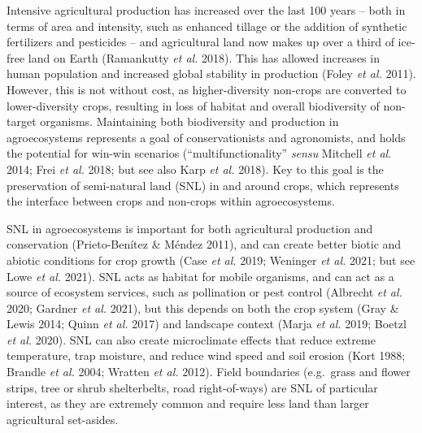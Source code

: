 \documentclass[]{elsarticle} %
\begin{document}
Intensive agricultural production has increased over the last 100 years -- both in terms of area and intensity, such as enhanced tillage or the addition of synthetic fertilizers and pesticides -- and agricultural land now makes up over a third of ice-free land on Earth (Ramankutty \emph{et al.} 2018).
This has allowed increases in human population and increased global stability in production (Foley \emph{et al.} 2011).
However, this is not without cost, as higher-diversity non-crops are converted to lower-diversity crops, resulting in loss of habitat and overall biodiversity of non-target organisms.
Maintaining both biodiversity and production in agroecosystems represents a goal of conservationists and agronomists, and holds the potential for win-win scenarios ({``multifunctionality''} \emph{sensu} Mitchell \emph{et al.} 2014; Frei \emph{et al.} 2018; but see also Karp \emph{et al.} 2018).
Key to this goal is the preservation of semi-natural land (SNL) in and around crops, which represents the interface between crops and non-crops within agroecosystems.

SNL in agroecosystems is important for both agricultural production and conservation (Prieto-Benítez \& Méndez 2011), and can create better biotic and abiotic conditions for crop growth (Case \emph{et al.} 2019; Weninger \emph{et al.} 2021; but see Lowe \emph{et al.} 2021).
SNL acts as habitat for mobile organisms, and can act as a source of ecosystem services, such as pollination or pest control (Albrecht \emph{et al.} 2020; Gardner \emph{et al.} 2021), but this depends on both the crop system (Gray \& Lewis 2014; Quinn \emph{et al.} 2017) and landscape context (Marja \emph{et al.} 2019; Boetzl \emph{et al.} 2020).
SNL can also create microclimate effects that reduce extreme temperature, trap moisture, and reduce wind speed and soil erosion (Kort 1988; Brandle \emph{et al.} 2004; Wratten \emph{et al.} 2012).
Field boundaries (e.g.~grass and flower strips, tree or shrub shelterbelts, road right-of-ways) are SNL of particular interest, as they are extremely common and require less land than larger agricultural set-asides.
\end{document}
